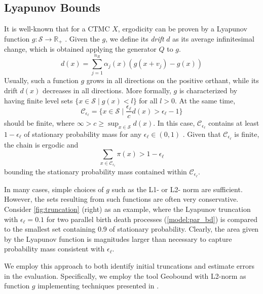 \subsection{Lyapunov Bounds}\label{sec:statagg:lyapunov}
It is well-known that for a \ac{CTMC} $X$, ergodicity can be proven by a Lyapunov function $g:\mathcal{S}\to\mathbb{R}_+$ \cite{meyn1993stability,dayar2011bounding}.
Given the $g$, we define its \emph{drift} $d$ as its average infinitesimal change, which is obtained applying the generator $Q$ to $g$. 
\begin{equation}
    d(x) = \sum_{j=1}^{n_R} \alpha_j(x) (g(x+v_j) -  g(x))
\end{equation}
Usually, such a function $g$ grows in all directions on the positive orthant, while its drift $d(x)$ decreases in all directions.
More formally, $g$ is characterized by having finite level sets $\{x\in\mathcal{S} \mid g(x) < l\}$ for all $l > 0$.
At the same time,
\begin{equation}\label{eq:lyapunov_set}
    \mathcal{C}_{\epsilon_{\ell}} = \{ x\in\mathcal{S} \mid
    \frac{\epsilon_{\ell}}{c}d(x) > \epsilon_{\ell} - 1\}
\end{equation}
should be finite, where $\infty> c\geq \sup_{x\in\mathcal{S}} d(x)$.
In this case, $\mathcal{C}_{\epsilon_{\ell}}$ contains at least $1-\epsilon_{\ell}$ of stationary probability mass for any $\epsilon_{\ell}\in(0,1)$ \cite[Thm.~8]{spieler2014numerical}.
Given that $\mathcal{C}_{\epsilon_{\ell}}$ is finite, the chain is ergodic and
\begin{equation}
    \sum_{x\in\mathcal{C}_{\epsilon_{\ell}}}\pi(x)> 1 - \epsilon_{\ell}
\end{equation}
bounding the stationary probability mass contained within $\mathcal{C}_{\epsilon_{\ell}}$.

In many cases, simple choices of $g$ such as the L1- or L2- norm are sufficient.
However, the sets resulting from such functions are often very conservative.
Consider \autoref{fig:truncation} (right) as an example, where the Lyapunov truncation with $\epsilon_{\ell}=0.1$ %
for two parallel birth death processes (\autoref{model:par_bd}) is compared to the smallest set containing 0.9 of stationary probability.
Clearly, the area given by the Lyapunov function is magnitudes larger than necessary to capture probability mass consistent with $\epsilon_{\ell}$.

We employ this approach to both identify initial truncations and estimate errors in the evaluation.
Specifically, we employ the tool Geobound with L2-norm as function $g$ implementing techniques presented in \cite{dayar2011bounding}.

